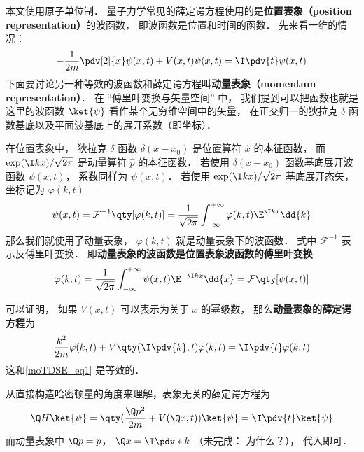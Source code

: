 

本文使用原子单位制． 量子力学常见的薛定谔方程使用的是\textbf{位置表象（position representation）}的波函数， 即波函数是位置和时间的函数． 先来看一维的情况：
\begin{equation}\label{moTDSE_eq1}
-\frac{1}{2m} \pdv[2]{x}\psi(x, t) + V(x,t)\psi(x,t) = \I \pdv{t} \psi(x,t)
\end{equation}
下面要讨论另一种等效的波函数和薛定谔方程叫\textbf{动量表象（momentum representation）}． 在 “傅里叶变换与矢量空间” 中， 我们提到可以把函数也就是这里的波函数 $\ket{\psi}$ 看作某个无穷维空间中的矢量， 在正交归一的狄拉克 $\delta$ 函数基底以及平面波基底上的展开系数（即坐标）．

在位置表象中， 狄拉克 $\delta$ 函数 $\delta(x-x_0)$ 是位置算符 $\hat x$ 的本征函数， 而 $\exp(\I kx)/\sqrt{2\pi}$ 是动量算符 $\hat p$ 的本征函数． 若使用 $\delta(x-x_0)$ 函数基底展开波函数 $\psi(x, t)$， 系数同样为 $\psi(x, t)$． 若使用 $\exp(\I kx)/\sqrt{2\pi}$ 基底展开态矢， 坐标记为 $\varphi(k, t)$
\begin{equation}\label{moTDSE_eq2}
\psi(x,t) = \mathcal{F}^{-1} \qty[\varphi(k,t)] = \frac{1}{\sqrt{2\pi}}\int_{-\infty}^{+\infty} \varphi(k,t)\E^{\I kx}\dd{k} 
\end{equation}
那么我们就使用了动量表象， $\varphi(k, t)$ 就是动量表象下的波函数． 式中 $\mathcal{F}^{-1}$ 表示反傅里叶变换． 即\textbf{动量表象的波函数是位置表象波函数的傅里叶变换}
\begin{equation}
\varphi(k,t) = \frac{1}{\sqrt{2\pi}}\int_{-\infty}^{+\infty} \psi(x,t)\E^{-\I kx}\dd{x} = \mathcal{F}\qty[\psi(x, t)]
\end{equation}

可以证明， 如果 $V(x,t)$ 可以表示为关于 $x$ 的幂级数， 那么\textbf{动量表象的薛定谔方程}为
\begin{equation}\label{moTDSE_eq3}
\frac{k^2}{2m}\varphi(k, t) + V\qty(\I \pdv{k}, t)\varphi(k, t) = \I \pdv{t} \varphi(k,t)
\end{equation}
这和\autoref{moTDSE_eq1} 是等效的．

从直接构造哈密顿量的角度来理解，表象无关的薛定谔方程为
\begin{equation}
\Q H\ket{\psi} = \qty(\frac{\Q p^2}{2m} + V(\Q x, t))\ket{\psi} = \I \pdv{t}\ket{\psi}
\end{equation}
而动量表象中 $\Q p = p$， $\Q x  = \I \pdv*{k}$ （未完成： 为什么？）， 代入即可．

